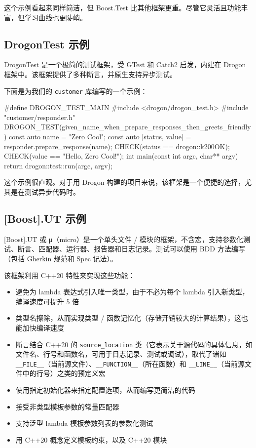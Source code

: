 这个示例看起来同样简洁，但 Boost.Test 比其他框架更重。尽管它灵活且功能丰富，但学习曲线也更陡峭。

\subsection{DrogonTest 示例}

\label{idx:832}
\label{idx:833}
DrogonTest 是一个极简的测试框架，受 GTest 和 Catch2 启发，内建在 Drogon 框架中。该框架提供了多种断言，并原生支持异步测试。

下面是为我们的 \texttt{customer} 库编写的一个示例：

\begin{codebox}[cpp]
#define DROGON_TEST_MAIN
#include <drogon/drogon_test.h>
#include "customer/responder.h"
DROGON_TEST(given_name_when_prepare_responses_then_greets_friendly) {
  const auto name = "Zero Cool";
  const auto [status, value] = responder{}.prepare_response(name);
  CHECK(status == drogon::k200OK);
  CHECK(value == "Hello, Zero Cool!");
}
int main(const int argc, char** argv) { return drogon::test::run(argc, argv); }
\end{codebox}

\label{idx:834}
\label{idx:835}
这个示例很直观。对于用 Drogon 构建的项目来说，该框架是一个便捷的选择，尤其是在测试异步代码时。

\subsection{[Boost].UT 示例}

\label{idx:836}
\label{idx:837}
[Boost].UT 或 μ（micro）是一个单头文件 / 模块的框架，不含宏，支持参数化测试、断言、匹配器、运行器、报告器和日志记录。测试可以使用 BDD 方法编写（包括 Gherkin 规范和 Spec 记法）。

该框架利用 C++20 特性来实现这些功能：

\begin{itemize}
\item 避免为 lambda 表达式引入唯一类型，由于不必为每个 lambda 引入新类型，编译速度可提升 5 倍
\item 类型名擦除，从而实现类型 / 函数记忆化（存储开销较大的计算结果），这也能加快编译速度
\item 断言结合 C++20 的 \texttt{source\_\allowbreak{}location} 类（它表示关于源代码的具体信息，如文件名、行号和函数名，可用于日志记录、测试或调试），取代了诸如 \texttt{\_\allowbreak{}\_\allowbreak{}FILE\_\allowbreak{}\_\allowbreak{}}（当前源文件）、\texttt{\_\allowbreak{}\_\allowbreak{}FUNCTION\_\allowbreak{}\_\allowbreak{}}（所在函数）和 \texttt{\_\allowbreak{}\_\allowbreak{}LINE\_\allowbreak{}\_\allowbreak{}}（当前源文件中的行号）之类的预定义宏
\item 使用指定初始化器来指定配置选项，从而编写更简洁的代码
\item 接受非类型模板参数的常量匹配器
\item 支持泛型 lambda 模板参数列表的参数化测试
\item 用 C++20 概念定义模板约束，以及 C++20 模块
\end{itemize}

